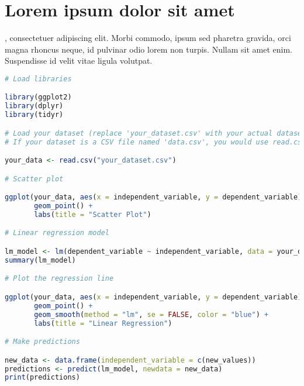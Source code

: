 \chapter{Lorem ipsum dolor sit amet}
    \label{chap:capitulo5}

, consectetuer adipiscing elit. Morbi commodo, ipsum sed pharetra gravida, orci magna rhoncus neque, id pulvinar odio lorem non turpis. Nullam sit amet enim. Suspendisse id velit vitae ligula volutpat.

\begin{lstlisting}[language = R, caption = R example]
# Load libraries

library(ggplot2)
library(dplyr)
library(tidyr)

# Load your dataset (replace 'your_dataset.csv' with your actual dataset file). 
# If your dataset is a CSV file named 'data.csv', you would use read.csv("data.csv"). If your data is in a different format or location, adjust accordingly.

your_data <- read.csv("your_dataset.csv")

# Scatter plot

ggplot(your_data, aes(x = independent_variable, y = dependent_variable)) +
       geom_point() +
       labs(title = "Scatter Plot")

# Linear regression model

lm_model <- lm(dependent_variable ~ independent_variable, data = your_data)
summary(lm_model)

# Plot the regression line

ggplot(your_data, aes(x = independent_variable, y = dependent_variable)) +
       geom_point() +
       geom_smooth(method = "lm", se = FALSE, color = "blue") +
       labs(title = "Linear Regression")

# Make predictions

new_data <- data.frame(independent_variable = c(new_values))
predictions <- predict(lm_model, newdata = new_data)
print(predictions)
\end{lstlisting}

\lipsum[2]

